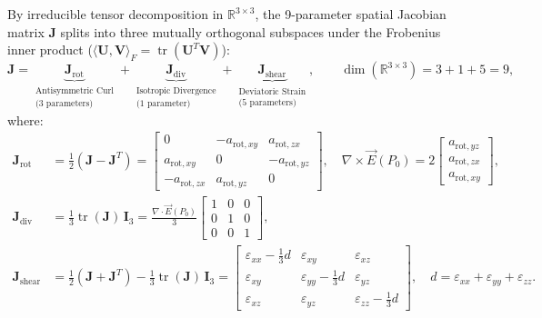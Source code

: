 \documentclass[preprint,12pt]{elsarticle}
\newcommand{\curl}{\nabla \times}
\newcommand{\divg}{\nabla \cdot}
\newcommand{\R}{\mathbb{R}}
\begin{document}
By irreducible tensor decomposition in $\R^{3\times 3}$, the 9-parameter spatial Jacobian matrix $\mathbf{J}$ splits into three mutually orthogonal subspaces under the Frobenius inner product ($\langle \mathbf{U}, \mathbf{V} \rangle_F = \operatorname{tr}(\mathbf{U}^T\mathbf{V})$):
\begin{equation}
    \mathbf{J} = \underbrace{\mathbf{J}_{\text{rot}}}_{\substack{\text{Antisymmetric Curl}\\ \text{(3 parameters)}}} + \underbrace{\mathbf{J}_{\text{div}}}_{\substack{\text{Isotropic Divergence}\\ \text{(1 parameter)}}} + \underbrace{\mathbf{J}_{\text{shear}}}_{\substack{\text{Deviatoric Strain}\\ \text{(5 parameters)}}}, \qquad \dim(\R^{3\times 3}) = 3 + 1 + 5 = 9,
    \label{eq:jacobian_split_3d}
\end{equation}
where:
\begin{align}
    \mathbf{J}_{\text{rot}} &= \frac{1}{2}(\mathbf{J} - \mathbf{J}^T) = \begin{bmatrix}
    0 & -a_{\text{rot},xy} & a_{\text{rot},zx} \\
    a_{\text{rot},xy} & 0 & -a_{\text{rot},yz} \\
    -a_{\text{rot},zx} & a_{\text{rot},yz} & 0
    \end{bmatrix}, \quad \curl\vec{E}(P_0) = 2\begin{bmatrix} a_{\text{rot},yz} \\ a_{\text{rot},zx} \\ a_{\text{rot},xy} \end{bmatrix}, \label{eq:J_rot_3d} \\
    \mathbf{J}_{\text{div}} &= \frac{1}{3}\operatorname{tr}(\mathbf{J})\,\mathbf{I}_3 = \frac{\divg\vec{E}(P_0)}{3}\begin{bmatrix} 1 & 0 & 0 \\ 0 & 1 & 0 \\ 0 & 0 & 1 \end{bmatrix}, \label{eq:J_div_3d} \\
    \mathbf{J}_{\text{shear}} &= \frac{1}{2}(\mathbf{J} + \mathbf{J}^T) - \frac{1}{3}\operatorname{tr}(\mathbf{J})\,\mathbf{I}_3 = \begin{bmatrix}
    \varepsilon_{xx} - \frac{1}{3}d & \varepsilon_{xy} & \varepsilon_{xz} \\
    \varepsilon_{xy} & \varepsilon_{yy} - \frac{1}{3}d & \varepsilon_{yz} \\
    \varepsilon_{xz} & \varepsilon_{yz} & \varepsilon_{zz} - \frac{1}{3}d
    \end{bmatrix}, \quad d = \varepsilon_{xx} + \varepsilon_{yy} + \varepsilon_{zz}. \label{eq:J_shear_3d}
\end{align}
\end{document}
